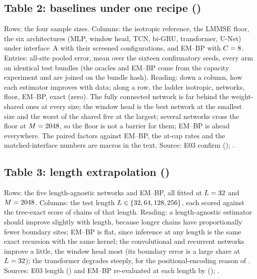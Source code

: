 \subsection{Table 2: baselines under one recipe ()}

Rows: the four sample sizes. Columns: the isotropic reference, the LMMSE floor, the six
architectures (MLP, window head, TCN, bi-GRU, transformer, U-Net) under interface~A with
their screened configurations, and EM--BP with $C=8$. Entries: all-site pooled error,
mean over the sixteen confirmatory seeds, every arm on identical test bundles (the
oracles and EM--BP come from the capacity experiment and are joined on the bundle hash).
Reading: down a column, how each estimator improves with data; along a row, the ladder
isotropic, networks, floor, EM--BP, exact (zero). The fully connected network is far
behind the weight-shared ones at every size; the window head is the best network at the
smallest size and the worst of the shared five at the largest; several networks cross
the floor at $M=2048$, so the floor is not a barrier for them; EM--BP is ahead
everywhere. The paired factors against EM--BP, the at-cap rates and the matched-interface
numbers are macros in the text. Source: E03 confirm ();
.

\subsection{Table 3: length extrapolation ()}

Rows: the five length-agnostic networks and EM--BP, all fitted at $L=32$ and
$M=2048$. Columns: the test length $L\in\{32,64,128,256\}$, each scored against
the tree-exact score of chains of that length. Reading: a length-agnostic estimator
should improve slightly with length, because longer chains have proportionally fewer
boundary sites; EM--BP is flat, since inference at any length is the same exact recursion
with the same kernel; the convolutional and recurrent networks improve a little, the
window head most (its boundary error is a large share at $L=32$); the transformer
degrades steeply, for the positional-encoding reason of .
Sources: E03 length () and EM--BP re-evaluated at each
length by  ();
.

